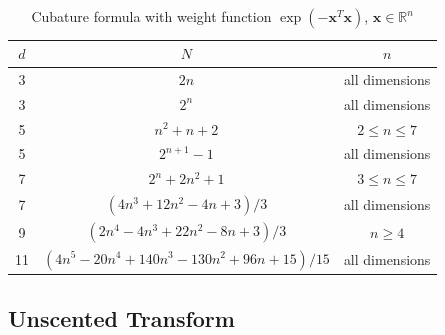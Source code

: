 \begin{table}
\begin{center}
\caption{Cubature formula with weight function $\exp(-\textbf{x}^T\textbf{x})$, $\textbf{x} \in \mathbb{R}^n$}
\label{tab:cubature}
\begin{tabular}{|c|c|c|}
\hline
$d$ & $N$ & $n$ \\ \hline
3  & $2n$ & all dimensions \\ \hline
3  & $2^n$ & all dimensions \\ \hline
5  & $n^2 + n + 2$ & $2 \leq n \leq 7$ \\ \hline
5  & $2^{n+1} - 1$ & all dimensions \\ \hline
7  & $2^n + 2n^2 + 1$ & $3 \leq n \leq 7$ \\ \hline
7  & $ ( 4n^3 + 12n^2 - 4n + 3 ) / 3$ & all dimensions \\ \hline
9  & $( 2n^4 - 4n^3 + 22n^2 - 8n + 3 ) / 3$ & $n \geq 4$ \\ \hline
11  & $( 4n^5 - 20n^4 + 140n^3 - 130n^2 + 96n + 15 ) / 15$ & all dimensions \\ \hline
\end{tabular}
\end{center}
\end{table}

\subsection{Unscented Transform}

